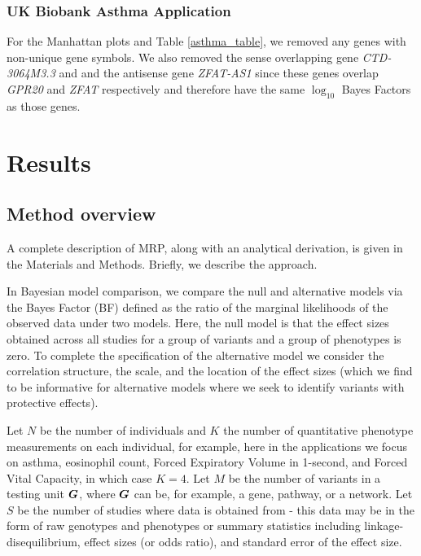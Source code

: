 \subsubsection*{UK Biobank Asthma Application}
For the Manhattan plots and Table \ref{asthma_table}, we removed any genes with non-unique gene symbols. We also removed the sense overlapping gene \textit{CTD-3064M3.3} and and the antisense gene \textit{ZFAT-AS1} since these genes overlap \textit{GPR20} and \textit{ZFAT} respectively and therefore have the same $\log_{10}$ Bayes Factors as those genes.


\section*{Results}

\subsection*{Method overview}
A complete description of MRP, along with an analytical derivation, is given in the Materials and Methods. Briefly, we describe the approach.

In Bayesian model comparison, we compare the null and alternative models via the Bayes Factor (BF) defined as the ratio of the marginal likelihoods of the observed data under two models. Here, the null model is that the effect sizes obtained across all studies for a group of variants and a group of phenotypes is zero. To complete the specification of the alternative model we consider the correlation structure, the scale, and the location of the effect sizes (which we find to be informative for alternative models where we seek to identify variants with protective effects). 

Let $N$ be the number of individuals and $K$ the number of quantitative phenotype measurements on each individual, for example, here in the applications we focus on asthma, eosinophil count, Forced Expiratory Volume in 1-second, and Forced Vital Capacity, in which case $K=4$. Let $M$ be the number of variants in a testing unit ${\boldsymbol G}$, where ${\boldsymbol G}$ can be, for example, a gene, pathway, or a network. Let $S$ be the number of studies where data is obtained from - this data may be in the form of raw genotypes and phenotypes or summary statistics including linkage-disequilibrium, effect sizes (or odds ratio), and standard error of the effect size.

